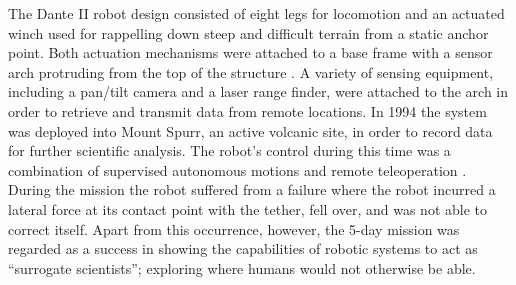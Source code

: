 \documentclass[12pt]{article}
\begin{document}
The Dante II robot design consisted of eight legs for locomotion and an 
actuated winch used for rappelling down steep and difficult terrain from a static anchor point. 
Both actuation mechanisms were attached to 
a base frame with a sensor arch protruding from the top of the structure \cite{dante_design}. A variety of
sensing equipment, including a pan/tilt camera and a laser range finder,
 were attached to the arch in order to retrieve and transmit data from remote
 locations. In 1994 the system was deployed into Mount Spurr, an active volcanic site, 
 in order to record data for further scientific analysis. The robot's control 
 during this time was a combination of supervised autonomous motions and remote
 teleoperation \cite{dante_results}. During the mission the robot suffered from a failure 
 where the robot incurred a lateral force at its contact
point with the tether, fell over, and was not able to correct itself. Apart from this occurrence, however, 
the 5-day mission was regarded as a success in showing the capabilities of robotic systems to act as ``surrogate scientists''; exploring where humans would not otherwise be able. 
\end{document}
